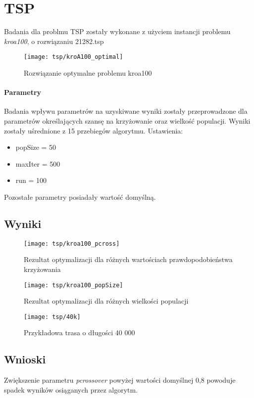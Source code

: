 \section{TSP}

Badania dla problmu TSP zostały wykonane z użyciem instancji problemu \textit{kroa100}, o rozwiązaniu 21282.tsp


\begin{figure}[H]
	\centering
	\texttt{[image: tsp/kroA100\_optimal]}
	\caption{Rozwiązanie optymalne problemu kroa100}
\end{figure}

\paragraph{Parametry}
Badania wpływu parametrów na uzyskiwane wyniki zostały przeprowadzone dla parametrów określających szansę na krzyżowanie oraz wielkość populacji. Wyniki zostały uśrednione z 15 przebiegów algorytmu. Ustawienia:

\begin{itemize}
	\item popSize = 50
	\item maxIter = 500
	\item run = 100
\end{itemize}

Pozostałe parametry posiadały wartość domyślną.

\subsection{Wyniki}

\begin{figure}[H]
	\centering
	\texttt{[image: tsp/kroa100\_pcross]}
	\caption{Rezultat optymalizacji dla różnych wartościach prawdopodobieństwa krzyżowania}
\end{figure}

\begin{figure}[H]
	\centering
	\texttt{[image: tsp/kroa100\_popSize]}
	\caption{Rezultat optymalizacji dla różnych wielkości populacji}
\end{figure}

\begin{figure}[H]
	\centering
	\texttt{[image: tsp/40k]}
	\caption{Przykładowa trasa o długości 40 000}
\end{figure}

\subsection{Wnioski}
Zwiększenie parametru \textit{pcrossover} powyżej wartości domyślnej 0,8 powoduje spadek wyników osiąganych przez algorytm.

